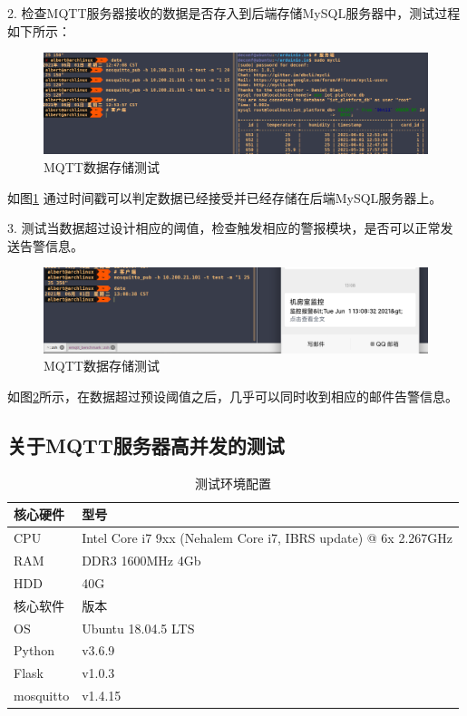 2. 检查MQTT服务器接收的数据是否存入到后端存储MySQL服务器中，测试过程如下所示：
\begin{figure}[htbp]
	\centering
	\includegraphics[width=0.85\linewidth]{figure/test-2}
	\caption{MQTT数据存储测试}
	\label{fig:6-2}
\end{figure}
如图\ref{fig:6-2} 通过时间戳可以判定数据已经接受并已经存储在后端MySQL服务器上。

3. 测试当数据超过设计相应的阈值，检查触发相应的警报模块，是否可以正常发送告警信息。
\begin{figure}[htbp]
	\centering
	\includegraphics[width=0.85\linewidth]{figure/test-3}
	\caption{MQTT数据存储测试}
	\label{fig:6-3}
\end{figure}
如图\ref{fig:6-3}所示，在数据超过预设阈值之后，几乎可以同时收到相应的邮件告警信息。

\subsection{关于MQTT服务器高并发的测试}

\begin{table}[H]
	\centering
	\caption{测试环境配置}  %
	\begin{tabular}{ll} 
		\hline
		\hline
		核心硬件 & 型号 \\ 
		\hline
		CPU	& Intel Core i7 9xx (Nehalem Core i7, IBRS update) @ 6x 2.267GHz		\\
		RAM	& DDR3 1600MHz 4Gb \\
		HDD	& 40G \\
		\hline
		\hline
		核心软件 & 版本 \\ 
		\hline
		OS	& Ubuntu 18.04.5 LTS \\
		Python & v3.6.9 \\
		Flask & v1.0.3 \\
		mosquitto & v1.4.15 \\
		\hline
	\end{tabular}
\end{table}


